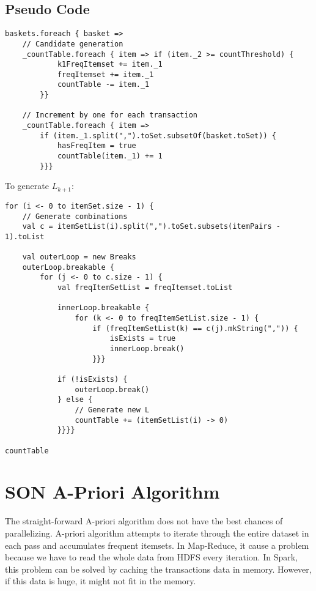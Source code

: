 \documentclass[11pt]{article}
\begin{document}
\subsection {Pseudo Code}
\begin{lstlisting}
baskets.foreach { basket =>
    // Candidate generation
    _countTable.foreach { item => if (item._2 >= countThreshold) {
            k1FreqItemset += item._1
            freqItemset += item._1
            countTable -= item._1
        }}

    // Increment by one for each transaction
    _countTable.foreach { item =>
        if (item._1.split(",").toSet.subsetOf(basket.toSet)) {
            hasFreqItem = true
            countTable(item._1) += 1
        }}}
\end{lstlisting}

To generate $L_{k+1}$: \\

\begin{lstlisting}
for (i <- 0 to itemSet.size - 1) {
    // Generate combinations
    val c = itemSetList(i).split(",").toSet.subsets(itemPairs - 1).toList

    val outerLoop = new Breaks
    outerLoop.breakable {
        for (j <- 0 to c.size - 1) {
            val freqItemSetList = freqItemset.toList

            innerLoop.breakable {
                for (k <- 0 to freqItemSetList.size - 1) {
                    if (freqItemSetList(k) == c(j).mkString(",")) {
                        isExists = true
                        innerLoop.break()
                    }}}

            if (!isExists) {
                outerLoop.break()
            } else {
                // Generate new L
                countTable += (itemSetList(i) -> 0)
            }}}}

countTable
\end{lstlisting}

\section{SON A-Priori Algorithm}

The straight-forward A-priori algorithm does not have the best chances of parallelizing.
A-priori algorithm attempts to iterate through the entire dataset in each pass and accumulates frequent itemsets.
In Map-Reduce, it cause a problem because we have to read the whole data from HDFS every iteration.
In Spark, this problem can be solved by caching the transactions data in memory.
However, if this data is huge, it might not fit in the memory.
\end{document}
